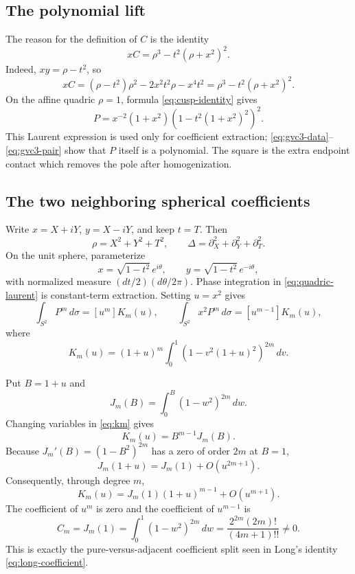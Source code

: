 \documentclass[11pt]{article}
\begin{document}
\subsection{The polynomial lift}

The reason for the definition of $C$ is the identity
\begin{equation}\label{eq:cusp-identity}
 xC=\rho^3-t^2(\rho+x^2)^2.
\end{equation}
Indeed, $xy=\rho-t^2$, so
\[
 xC=(\rho-t^2)\rho^2-2x^2t^2\rho-x^4t^2
    =\rho^3-t^2(\rho+x^2)^2.
\]
On the affine quadric $\rho=1$, formula \eqref{eq:cusp-identity} gives
\begin{equation}\label{eq:quadric-laurent}
 P=x^{-2}(1+x^2)
       \left(1-t^2(1+x^2)^2\right)^2.
\end{equation}
This Laurent expression is used only for coefficient extraction;
\eqref{eq:gvc3-data}--\eqref{eq:gvc3-pair} show that $P$ itself is a
polynomial.  The square is the extra endpoint contact which removes the
pole after homogenization.

\subsection{The two neighboring spherical coefficients}

Write $x=X+iY$, $y=X-iY$, and keep $t=T$.  Then
\[
 \rho=X^2+Y^2+T^2,
 \qquad
 \Delta=\partial_X^2+\partial_Y^2+\partial_T^2.
\]
On the unit sphere, parameterize
\[
 x=\sqrt{1-t^2}\,e^{i\theta},
 \qquad y=\sqrt{1-t^2}\,e^{-i\theta},
\]
with normalized measure $(dt/2)(d\theta/2\pi)$.  Phase integration in
\eqref{eq:quadric-laurent} is constant-term extraction.  Setting $u=x^2$
gives
\begin{equation}\label{eq:sphere-coefficients}
 \int_{S^2}P^m\,d\sigma=[u^m]K_m(u),
 \qquad
 \int_{S^2}x^2P^m\,d\sigma=[u^{m-1}]K_m(u),
\end{equation}
where
\begin{equation}\label{eq:km}
 K_m(u)=(1+u)^m\int_0^1
       \left(1-v^2(1+u)^2\right)^{2m}\,dv.
\end{equation}

Put $B=1+u$ and
\[
 J_m(B)=\int_0^B(1-w^2)^{2m}\,dw.
\]
Changing variables in \eqref{eq:km} gives
\[
 K_m(u)=B^{m-1}J_m(B).
\]
Because $J_m'(B)=(1-B^2)^{2m}$ has a zero of order $2m$ at $B=1$,
\[
 J_m(1+u)=J_m(1)+O(u^{2m+1}).
\]
Consequently, through degree $m$,
\[
 K_m(u)=J_m(1)(1+u)^{m-1}+O(u^{m+1}).
\]
The coefficient of $u^m$ is zero and the coefficient of $u^{m-1}$ is
\begin{equation}\label{eq:cm}
 C_m=J_m(1)=\int_0^1(1-w^2)^{2m}\,dw
 =\frac{2^{2m}(2m)!}{(4m+1)!!}\ne0.
\end{equation}
This is exactly the pure-versus-adjacent coefficient split seen in Long's
identity \eqref{eq:long-coefficient}.
\end{document}

